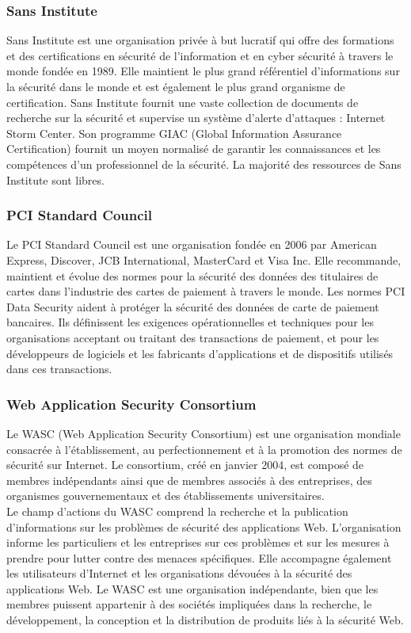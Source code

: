 \subsubsection{Sans Institute}
Sans Institute est une organisation privée à but lucratif qui offre des formations et des certifications en sécurité de l'information et en cyber sécurité à travers le monde fondée en 1989. Elle maintient le plus grand référentiel d'informations sur la sécurité dans le monde et est également le plus grand organisme de certification. Sans Institute fournit une vaste collection de documents de recherche sur la sécurité et supervise un système d’alerte d’attaques : Internet Storm Center. Son programme GIAC (Global Information Assurance Certification) fournit un moyen normalisé de garantir les connaissances et les compétences d'un professionnel de la sécurité. La majorité des ressources de Sans Institute sont libres.\\
\subsubsection{PCI Standard Council}
Le PCI Standard Council est une organisation fondée en 2006 par American Express, Discover, JCB International, MasterCard et Visa Inc. Elle recommande, maintient et évolue des normes pour la sécurité des données des titulaires de cartes dans l'industrie des cartes de paiement à travers le monde. Les normes PCI Data Security aident à protéger la sécurité des données de carte de paiement bancaires. Ils définissent les exigences opérationnelles et techniques pour les organisations acceptant ou traitant des transactions de paiement, et pour les développeurs de logiciels et les fabricants d'applications et de dispositifs utilisés dans ces transactions.
\subsubsection{Web Application Security Consortium}
Le WASC (Web Application Security Consortium) est une organisation mondiale consacrée à l'établissement, au perfectionnement et à la promotion des normes de sécurité sur Internet. Le consortium, créé en janvier 2004, est composé de membres indépendants ainsi que de membres associés à des entreprises, des organismes gouvernementaux et des établissements universitaires.\\
Le champ d'actions du WASC comprend la recherche et la publication d'informations sur les problèmes de sécurité des applications Web. L’organisation informe les particuliers et les entreprises sur ces problèmes et sur les mesures à prendre pour lutter contre des menaces spécifiques. Elle accompagne également les utilisateurs d’Internet et les organisations dévouées à la sécurité des applications Web. Le WASC est une organisation indépendante, bien que les membres puissent appartenir à des sociétés impliquées dans la recherche, le développement, la conception et la distribution de produits liés à la sécurité Web.\\

